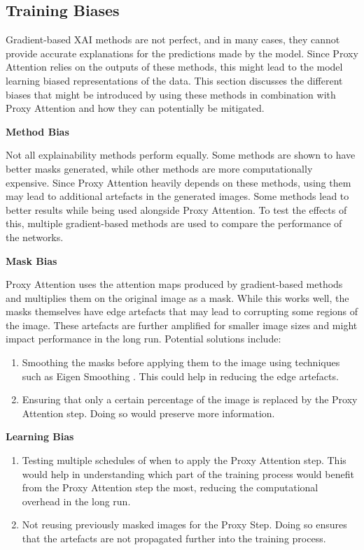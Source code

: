 \documentclass[a4paper,11pt,openright]{book}
\begin{document}
\subsection{Training Biases}
Gradient-based XAI methods are not perfect, and in many cases, they cannot provide accurate explanations for the predictions made by the model. Since Proxy Attention relies on the outputs of these methods, this might lead to the model learning biased representations of the data. This section discusses the different biases that might be introduced by using these methods in combination with Proxy Attention and how they can potentially be mitigated.

\textbf{Method Bias}

Not all explainability methods perform equally. Some methods are shown to have better masks generated, while other methods are more computationally expensive. Since Proxy Attention heavily depends on these methods, using them may lead to additional artefacts in the generated images. Some methods lead to better results while being used alongside Proxy Attention. To test the effects of this, multiple gradient-based methods are used to compare the performance of the networks.

\textbf{Mask Bias}

Proxy Attention uses the attention maps produced by gradient-based methods and multiplies them on the original image as a mask. While this works well, the masks themselves have edge artefacts that may lead to corrupting some regions of the image. These artefacts are further amplified for smaller image sizes and might impact performance in the long run.
Potential solutions include:

\begin{enumerate}
    \item Smoothing the masks before applying them to the image using techniques such as Eigen Smoothing \cite{banymuhammadEigenCAMVisualExplanations2021}. This could help in reducing the edge artefacts.
    \item Ensuring that only a certain percentage of the image is replaced by the Proxy Attention step. Doing so would preserve more information.
\end{enumerate}

\textbf{Learning Bias}
\begin{enumerate}
    \item Testing multiple schedules of when to apply the Proxy Attention step. This would help in understanding which part of the training process would benefit from the Proxy Attention step the most, reducing the computational overhead in the long run.
    \item Not reusing previously masked images for the Proxy Step. Doing so ensures that the artefacts are not propagated further into the training process.
\end{enumerate}
\end{document}
